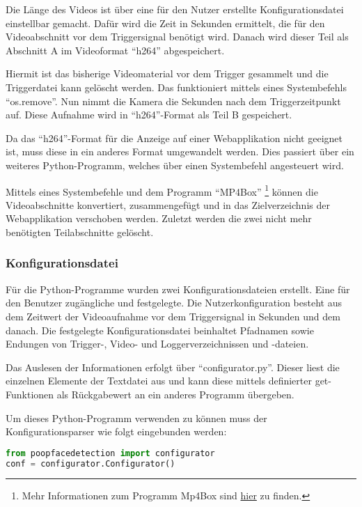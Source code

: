 Die Länge des Videos ist über eine für den Nutzer erstellte Konfigurationsdatei einstellbar gemacht. Dafür wird die Zeit in Sekunden ermittelt, die für den Videoabschnitt vor dem Triggersignal benötigt wird. Danach wird dieser Teil als Abschnitt A im Videoformat "`h264"' abgespeichert.

Hiermit ist das bisherige Videomaterial vor dem Trigger gesammelt und die Triggerdatei kann gelöscht werden. Das funktioniert mittels eines Systembefehls "`os.remove"'. Nun nimmt die Kamera die Sekunden nach dem Triggerzeitpunkt auf. Diese Aufnahme wird in "`h264"'-Format als Teil B gespeichert.

Da das "`h264"'-Format für die Anzeige auf einer Webapplikation nicht geeignet ist, muss diese in ein anderes Format umgewandelt werden. Dies passiert über ein weiteres Python-Programm, welches über einen Systembefehl angesteuert wird.

Mittels eines Systembefehle und dem Programm "`MP4Box"' \footnote{Mehr Informationen zum Programm Mp4Box sind \href{https://www.videohelp.com/software/My-MP4Box-GUI}{hier} zu finden.} können die Videoabschnitte konvertiert, zusammengefügt und in das Zielverzeichnis der Webapplikation verschoben werden. Zuletzt werden die zwei nicht mehr benötigten Teilabschnitte gelöscht.

\subsubsection{Konfigurationsdatei}
\label{subsubsec:configfile}

Für die Python-Programme wurden zwei Konfigurationsdateien erstellt. Eine für den Benutzer zugängliche und festgelegte.
Die Nutzerkonfiguration besteht aus dem Zeitwert der Videoaufnahme vor dem Triggersignal in Sekunden und dem danach.
Die festgelegte Konfigurationsdatei beinhaltet Pfadnamen sowie Endungen von Trigger-, Video- und Loggerverzeichnissen und -dateien.

Das Auslesen der Informationen erfolgt über "`configurator.py"'. Dieser liest die einzelnen Elemente der Textdatei aus und kann diese mittels definierter get-Funktionen als Rückgabewert an ein anderes Programm übergeben.

Um dieses Python-Programm verwenden zu können muss der Konfigurationsparser wie folgt eingebunden werden:

\begin{lstlisting}[language=Python]
from poopfacedetection import configurator
conf = configurator.Configurator()
\end{lstlisting}


